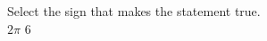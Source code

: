\documentclass{ximera}
\author{David Kish}
\begin{document}
\begin{exercise}
Select the sign that makes the statement true.\\
$2\pi$ \wordChoice{\choice{$<$}\choice[correct]{$>$}\choice{$=$}} $6$ 

\end{exercise}
\end{document}
